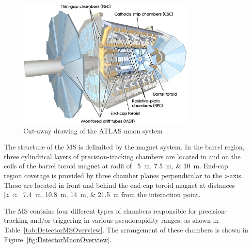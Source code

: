 \begin{figure}[p]
  \centering  
  \includegraphics[width=0.80\textwidth]{PartDetector/Diagrams/ATLAS_MuonSystem.eps}
  \caption[Cut-away drawing of the ATLAS muon system.]{Cut-away drawing of the ATLAS muon system~\cite{Detector:ATLASExperimentGeneral}.}
  \label{fig:DetectorDrawingMuonSystem}
\end{figure}

The structure of the MS is delimited by the magnet system. In the barrel region, three cylindrical layers of precision-tracking chambers are located in and on the coils of the barrel toroid magnet at radii of ~\SIlist{5;7.5;10}{\meter}. End-cap region coverage is provided by three chamber planes perpendicular to the $z$-axis. These are located in front and behind the end-cap toroid magnet at distances $|z|\approx$~\SIlist{7.4;10.8;14;21.5}{\meter} from the interaction point.

The MS contains four different types of chambers responsible for precision-tracking and/or triggering in various pseudorapidity ranges, as shown in Table~\ref{tab:DetectorMSOverview}. The arrangement of these chambers is shown in Figure~\ref{fig:DetectorMuonOverview}.

